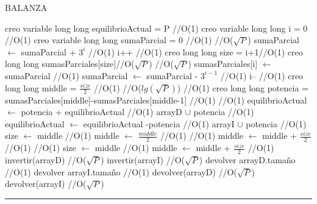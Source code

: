 \begin{algorithm}[H]
\caption{BALANZA}
\begin{algorithmic}[1]
\state creo variable long long equilibrioActual = P \hfill //O(1)
\state creo variable long long i = 0 \hfill //O(1)
\state creo variable long long sumaParcial = 0 \hfill //O(1)
 \hfill //O($\sqrt{P}$)
\state sumaParcial  $\gets$ sumaParcial + $3^i$ \hfill //O(1)
\state i++ \hfill //O(1)
\endwhile
\state creo long long size = i+1\hfill //O(1)
\state creo long long sumasParciales[size]\hfill //O($\sqrt{P}$)
 \hfill //O($\sqrt{P}$)
\state sumasParciales[i]  $\gets$ sumaParcial \hfill //O(1)
\state sumaParcial $\gets$ sumaParcial - $3^{i-1}$ \hfill //O(1)
\state i-- \hfill //O(1)
\endwhile
\state creo long long middle = $\frac{size}{2}$ \hfill //O(1)
 \hfill //O($lg(\sqrt{P})$) 
 \hfill //O(1)
\state creo long long potencia = sumasParciales[middle]-sumasParciales[middle-1] \hfill //O(1)
 \hfill //O(1)
\state  equilibrioActual $\gets$ potencia + equilibrioActual \hfill //O(1)
\state arrayD $\cup$ potencia \hfill //O(1)
\Else
\state  equilibrioActual $\gets$ equilibrioActual -potencia \hfill //O(1)
\state arrayI $\cup$ potencia \hfill //O(1)
\endif
\state size $\gets$ middle \hfill //O(1)
\state middle $\gets$ $\frac{middle}{2}$ \hfill //O(1)
\endif
{} \hfill //O(1)
\state middle $\gets$ middle + $\frac{size}{2}$ \hfill //O(1)
\endif
{} \hfill //O(1)
\state size $\gets$ middle  \hfill //O(1)
\state middle $\gets$ middle + $\frac{size}{2}$ \hfill //O(1)
\endif
\endwhile
\state invertir(arrayD) \hfill //O($\sqrt{P}$)
\state invertir(arrayI) \hfill //O($\sqrt{P}$)
\state devolver arrayD.tamaño \hfill //O(1)
\state devolver arrayI.tamaño \hfill //O(1)
\state devolver(arrayD) \hfill //O($\sqrt{P}$)
\state devolver(arrayI) \hfill //O($\sqrt{P}$)
\EndFunction 
\end{algorithmic}
\hrule
{}
\end{algorithm}

